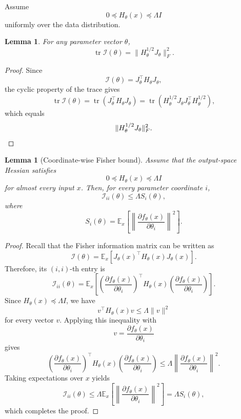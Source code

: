 \documentclass{article}
\newtheorem{lemma}[theorem]{Lemma}
\theoremstyle{definition}
\theoremstyle{remark}
\begin{document}
Assume
\[
0\preceq H_\theta(x)\preceq\Lambda I
\]
uniformly over the data distribution.

\begin{lemma}
For any parameter vector $\theta$,
\[
\operatorname{tr}\mathcal I(\theta)
=
\|H_\theta^{1/2}J_\theta\|_F^2.
\]
\end{lemma}

\begin{proof}
Since
\[
\mathcal I(\theta)=J_\theta^\top H_\theta J_\theta,
\]
the cyclic property of the trace gives
\[
\operatorname{tr}\mathcal I(\theta)
=
\operatorname{tr}(J_\theta^\top H_\theta J_\theta)
=
\operatorname{tr}(H_\theta^{1/2}J_\theta J_\theta^\top H_\theta^{1/2}),
\]
which equals
\[
\|H_\theta^{1/2}J_\theta\|_F^2.
\qedhere
\]
\end{proof}

\begin{lemma}[Coordinate-wise Fisher bound]
\label{lem:coordinate_fisher_bound}
Assume that the output-space Hessian satisfies
\[
0 \preceq H_\theta(x) \preceq \Lambda I
\]
for almost every input $x$. Then, for every parameter coordinate $i$,
\[
\mathcal{I}_{ii}(\theta)
\le
\Lambda S_i(\theta),
\]
where
\[
S_i(\theta)
=
\mathbb{E}_x\!\left[
\left\|
\frac{\partial f_\theta(x)}{\partial \theta_i}
\right\|^2
\right].
\]
\end{lemma}

\begin{proof}
Recall that the Fisher information matrix can be written as
\[
\mathcal{I}(\theta)
=
\mathbb{E}_x\!\left[
J_\theta(x)^\top
H_\theta(x)
J_\theta(x)
\right].
\]
Therefore, its $(i,i)$-th entry is
\[
\mathcal{I}_{ii}(\theta)
=
\mathbb{E}_x\!\left[
\left(
\frac{\partial f_\theta(x)}{\partial \theta_i}
\right)^\top
H_\theta(x)
\left(
\frac{\partial f_\theta(x)}{\partial \theta_i}
\right)
\right].
\]
Since $H_\theta(x)\preceq \Lambda I$, we have
\[
v^\top H_\theta(x)v
\le
\Lambda\|v\|^2
\]
for every vector $v$. Applying this inequality with
\[
v=\frac{\partial f_\theta(x)}{\partial\theta_i}
\]
gives
\[
\left(
\frac{\partial f_\theta(x)}{\partial\theta_i}
\right)^\top
H_\theta(x)
\left(
\frac{\partial f_\theta(x)}{\partial\theta_i}
\right)
\le
\Lambda
\left\|
\frac{\partial f_\theta(x)}{\partial\theta_i}
\right\|^2.
\]
Taking expectations over $x$ yields
\[
\mathcal{I}_{ii}(\theta)
\le
\Lambda
\mathbb{E}_x\!\left[
\left\|
\frac{\partial f_\theta(x)}{\partial\theta_i}
\right\|^2
\right]
=
\Lambda S_i(\theta),
\]
which completes the proof.
\end{proof}
\end{document}
